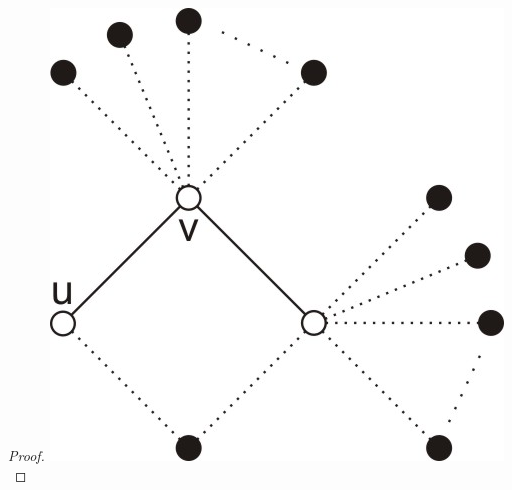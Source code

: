 \documentclass{pracamgr}
\begin{document}
\begin{proof}
   \includegraphics{img/Q_niezablokowane_3.jpg}
   \end{proof}
\end{document}
